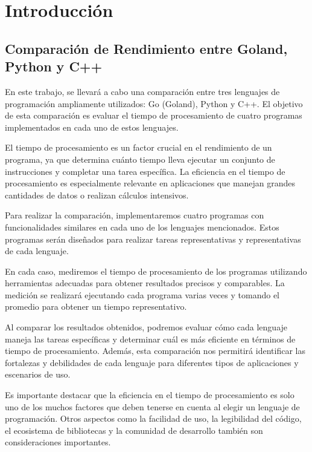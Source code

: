 \documentclass[]{report}
\title{}
\author{}
\begin{document}
\maketitle

\begin{abstract}
\end{abstract}
\section{Introducción}


\subsection{Comparación de Rendimiento entre Goland, Python y C++}
En este trabajo, se llevará a cabo una comparación entre tres lenguajes de programación ampliamente utilizados: Go (Goland), Python y C++. El objetivo de esta comparación es evaluar el tiempo de procesamiento de cuatro programas implementados en cada uno de estos lenguajes.

El tiempo de procesamiento es un factor crucial en el rendimiento de un programa, ya que determina cuánto tiempo lleva ejecutar un conjunto de instrucciones y completar una tarea específica. La eficiencia en el tiempo de procesamiento es especialmente relevante en aplicaciones que manejan grandes cantidades de datos o realizan cálculos intensivos.

Para realizar la comparación, implementaremos cuatro programas con funcionalidades similares en cada uno de los lenguajes mencionados. Estos programas serán diseñados para realizar tareas representativas y representativas de cada lenguaje.

En cada caso, mediremos el tiempo de procesamiento de los programas utilizando herramientas adecuadas para obtener resultados precisos y comparables. La medición se realizará ejecutando cada programa varias veces y tomando el promedio para obtener un tiempo representativo.

Al comparar los resultados obtenidos, podremos evaluar cómo cada lenguaje maneja las tareas específicas y determinar cuál es más eficiente en términos de tiempo de procesamiento. Además, esta comparación nos permitirá identificar las fortalezas y debilidades de cada lenguaje para diferentes tipos de aplicaciones y escenarios de uso.

Es importante destacar que la eficiencia en el tiempo de procesamiento es solo uno de los muchos factores que deben tenerse en cuenta al elegir un lenguaje de programación. Otros aspectos como la facilidad de uso, la legibilidad del código, el ecosistema de bibliotecas y la comunidad de desarrollo también son consideraciones importantes.
\end{document}
